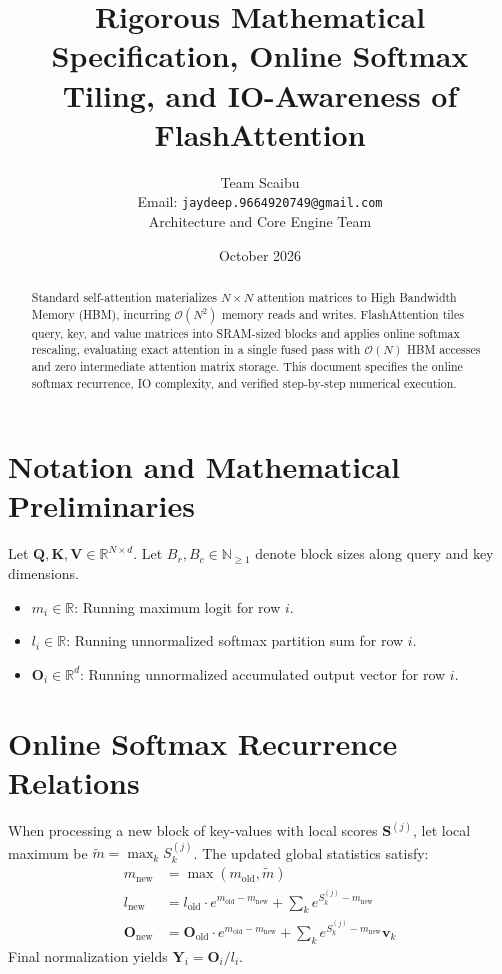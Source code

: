 \documentclass[11pt,a4paper]{article}
\title{\textbf{Rigorous Mathematical Specification, Online Softmax Tiling, and IO-Awareness of FlashAttention}}
\author{Team Scaibu \\ \small Email: \texttt{jaydeep.9664920749@gmail.com} \\ \small Architecture and Core Engine Team}
\date{October 2026}
\theoremstyle{definition}
\begin{document}
\maketitle

\begin{abstract}
Standard self-attention materializes $N \times N$ attention matrices to High Bandwidth Memory (HBM), incurring $\mathcal{O}(N^2)$ memory reads and writes. FlashAttention tiles query, key, and value matrices into SRAM-sized blocks and applies online softmax rescaling, evaluating exact attention in a single fused pass with $\mathcal{O}(N)$ HBM accesses and zero intermediate attention matrix storage. This document specifies the online softmax recurrence, IO complexity, and verified step-by-step numerical execution.
\end{abstract}

\section{Notation and Mathematical Preliminaries}

Let $\mathbf{Q}, \mathbf{K}, \mathbf{V} \in \mathbb{R}^{N \times d}$. Let $B_r, B_c \in \mathbb{N}_{\ge 1}$ denote block sizes along query and key dimensions.

\begin{itemize}
    \item $m_i \in \mathbb{R}$: Running maximum logit for row $i$.
    \item $l_i \in \mathbb{R}$: Running unnormalized softmax partition sum for row $i$.
    \item $\mathbf{O}_i \in \mathbb{R}^d$: Running unnormalized accumulated output vector for row $i$.
\end{itemize}

\section{Online Softmax Recurrence Relations}

When processing a new block of key-values with local scores $\mathbf{S}^{(j)}$, let local maximum be $\tilde{m} = \max_k S_k^{(j)}$. The updated global statistics satisfy:
\begin{align}
m_{\text{new}} &= \max(m_{\text{old}}, \tilde{m}) \\
l_{\text{new}} &= l_{\text{old}} \cdot e^{m_{\text{old}} - m_{\text{new}}} + \sum_{k} e^{S_k^{(j)} - m_{\text{new}}} \\
\mathbf{O}_{\text{new}} &= \mathbf{O}_{\text{old}} \cdot e^{m_{\text{old}} - m_{\text{new}}} + \sum_{k} e^{S_k^{(j)} - m_{\text{new}}} \mathbf{v}_k
\end{align}
Final normalization yields $\mathbf{Y}_i = \mathbf{O}_i / l_i$.
\end{document}
